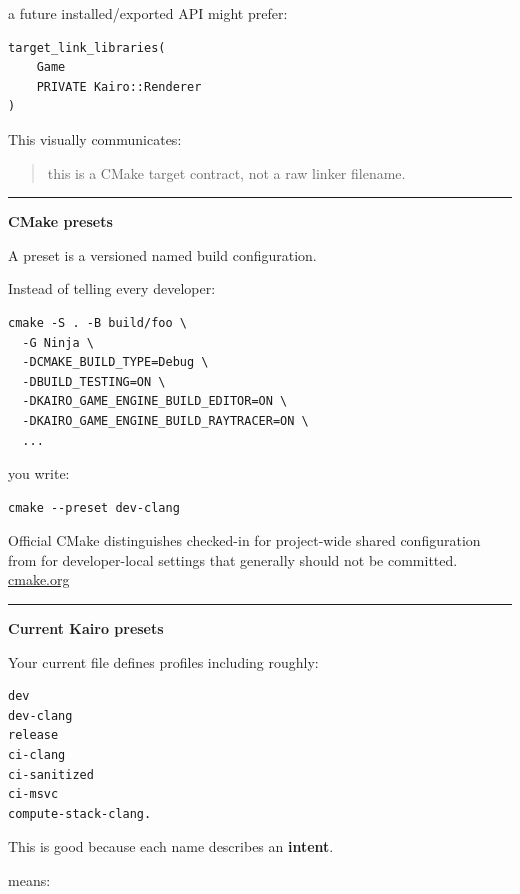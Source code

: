 a future installed/exported API might prefer:

\begin{verbatim}
target_link_libraries(
    Game
    PRIVATE Kairo::Renderer
)
\end{verbatim}

This visually communicates:

\begin{quote}
this is a CMake target contract, not a raw linker filename.
\end{quote}

\begin{center}\rule{0.5\linewidth}{0.5pt}\end{center}

\textbf{CMake presets}

A preset is a versioned named build configuration.

Instead of telling every developer:

\begin{verbatim}
cmake -S . -B build/foo \
  -G Ninja \
  -DCMAKE_BUILD_TYPE=Debug \
  -DBUILD_TESTING=ON \
  -DKAIRO_GAME_ENGINE_BUILD_EDITOR=ON \
  -DKAIRO_GAME_ENGINE_BUILD_RAYTRACER=ON \
  ...
\end{verbatim}

you write:

\begin{verbatim}
cmake --preset dev-clang
\end{verbatim}

Official CMake distinguishes checked-in  for project-wide shared configuration from  for developer-local settings that generally should not be committed. \href{https://cmake.org/cmake/help/latest/manual/cmake-presets.7.html?utm_source=chatgpt.com}{cmake.org}

\begin{center}\rule{0.5\linewidth}{0.5pt}\end{center}

\textbf{Current Kairo presets}

Your current file defines profiles including roughly:

\begin{verbatim}
dev
dev-clang
release
ci-clang
ci-sanitized
ci-msvc
compute-stack-clang.
\end{verbatim}

This is good because each name describes an \textbf{intent}.

 means:

